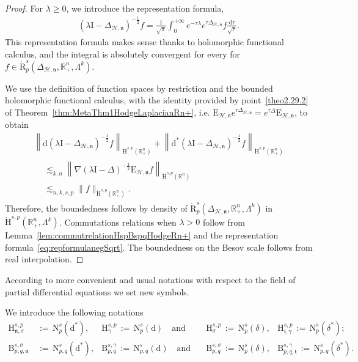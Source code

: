 \documentclass[AHL,Unicode,longabstracts,published]{cedram}
\newcommand{\bbR}{\mathbb{R}}
\newcommand{\rmH}{\mathrm{H}}%
\newcommand{\rmB}{\mathrm{B}}
\newcommand{\rmd}{\mathrm{d}}
\newcommand{\rmR}{\mathrm{R}}
\newcommand{\rmE}{\mathrm{E}}
\newcommand{\rmN}{\mathrm{N}}
\newcommand{\rmI}{\mathrm{I}}
\newcommand{\clH}{\mathcal{H}}
\newcommand{\fkn}{\mathfrak{n}}
\newcommand{\fkt}{\mathfrak{t}}
\begin{document}
\begin{proof}
For $\lambda\geqslant 0$, we introduce the representation formula,
\begin{align}\label{eq:repformulanegSqrt}
(\lambda \rmI -\Delta_{\clH,\fkn})^{-\frac{1}{2}} f = \frac{1}{\sqrt{\pi}}\int_{0}^{+\infty} e^{-\tau\lambda}e^{\tau\Delta_{\clH,\fkn}}f \frac{\rmd\tau}{\sqrt{\tau}} .
\end{align}
This representation formula makes sense thanks to holomorphic functional calculus, and the integral is absolutely convergent for every for $f\in \dot{\rmR}^s_{p}(\Delta_{\clH,\fkn},\bbR^n_+,\Lambda^k)$.

We use the definition of function spaces by restriction and the bounded holomorphic functional calculus, with the identity provided by point~\eqref{theo2.29.2} of Theorem~\ref{thm:MetaThm1HodgeLaplacianRn+}, i.e. $\rmE _{\clH,\fkn}e^{\tau\Delta_{\clH,\fkn}} = e^{\tau\Delta}\rmE_{\clH,\fkn}$, to obtain
\begin{multline*}
\left\| \rmd\left(\lambda \rmI -\Delta_{\clH,\fkn}\right)^{-\frac{1}{2}} f\right\|_{\dot{\rmH}^{s,p}\left(\bbR^{n}_+\right)} + \left\| \rmd^\ast\left(\lambda \rmI -\Delta_{\clH,\fkn}\right)^{-\frac{1}{2}} f\right\|_{\dot{\rmH}^{s,p}\left(\bbR^{n}_+\right)}\\
\begin{aligned}
&\lesssim_{k,n} \left\| \nabla (\lambda \rmI -\Delta)^{-\frac{1}{2}} \rmE _{\clH,\fkn} f\right\|_{\dot{\rmH}^{s,p}\left(\bbR^{n}\right)}
\\
&\lesssim_{n,k,s,p} \| f\|_{\dot{\rmH}^{s,p}\left(\bbR^{n}_+\right)}.
\end{aligned}
\end{multline*}
Therefore, the boundedness follows by density of $\dot{\rmR}^s_{p}(\Delta_{\clH,\fkn},\bbR^n_+,\Lambda^k)$ in $\dot{\rmH}^{s,p}(\bbR^n_+,\Lambda^k)$. Commutations relations when $\lambda>0$ follow from Lemma~\ref{lem:commutrelationHspBspqHodgeRn+} and the representation formula~\eqref{eq:repformulanegSqrt}. The boundedness on the Besov scale follows from real interpolation.
\end{proof}


According to more convenient and usual notations with respect to the field of partial differential equations we set new symbols.

\begin{notas}\label{def:newNotationsSoleinodalSpaces}
We introduce the following notations
\begin{align*}
{\rmH}^{s,p}_{{\fkn},\sigma}\, &{:=}\,{\rmN}^{s}_{p}\left(\rmd^\ast\right),  &{\rmH}^{s,p}_{\gamma}\,{:=}\,{\rmN}^{s}_{p}(\rmd) \quad\text{and}\quad &{\rmH}^{s,p}_{\sigma}\,{:=}\,{\rmN}^{s}_{p}(\delta),  &{\rmH}^{s,p}_{{\fkt},\gamma}\,{:=}\,{\rmN}^{s}_{p}\left(\delta^\ast\right);\\
{\rmB}^{s,\sigma}_{p,q,{\fkn}}\,&{:=}\,{\rmN}^{s}_{p,q}(\rmd^\ast), &{\rmB}^{s,\gamma}_{p,q} \,{:=}\,{\rmN }^{s}_{p,q}(\rmd) \quad\text{and}\quad &{\rmB}^{s,\sigma}_{p,q}\,{:=}\,{\rmN}^{s}_{p}(\delta), &{\rmB}^{s,\gamma}_{p,q,{\fkt}} \,{:=}\,{\rmN}^{s}_{p,q}\left(\delta^\ast\right).
\end{align*}
\end{notas}
\end{document}
